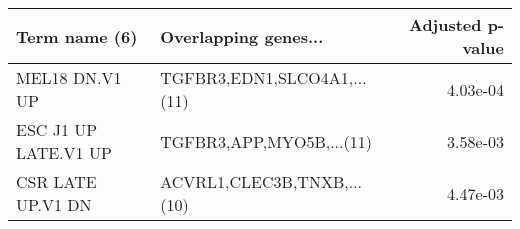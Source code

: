 \begin{tabular}{llr}
\toprule
       Term name (6) &        Overlapping genes... &  Adjusted p-value \\
\midrule
      MEL18 DN.V1 UP & TGFBR3,EDN1,SLCO4A1,...(11) &          4.03e-04 \\
ESC J1 UP LATE.V1 UP &    TGFBR3,APP,MYO5B,...(11) &          3.58e-03 \\
   CSR LATE UP.V1 DN &  ACVRL1,CLEC3B,TNXB,...(10) &          4.47e-03 \\
\bottomrule
\end{tabular}
